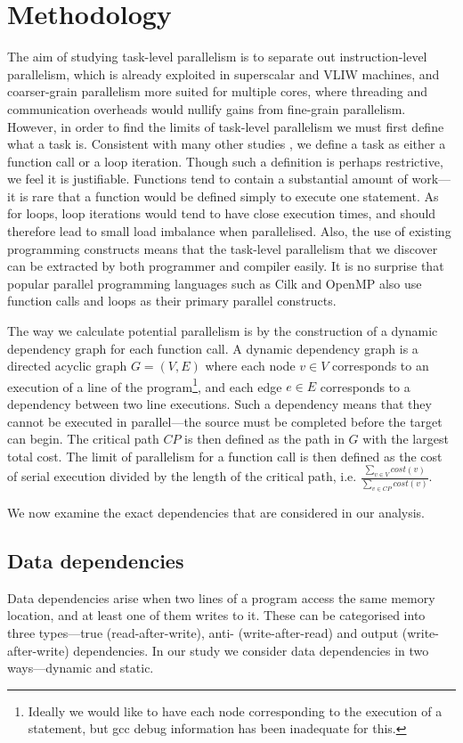 \section{Methodology}

The aim of studying task-level parallelism is to separate out instruction-level parallelism, which is already exploited in superscalar and VLIW machines, and coarser-grain parallelism more suited for multiple cores, where threading and communication overheads would nullify gains from fine-grain parallelism.
However, in order to find the limits of task-level parallelism we must first define what a task is.
Consistent with many other studies \cite{Kreaseck00limitsof}, we define a task as either a function call or a loop iteration.
Though such a definition is perhaps restrictive, we feel it is justifiable.
Functions tend to contain a substantial amount of work---it is rare that a function would be defined simply to execute one statement.
As for loops, loop iterations would tend to have close execution times, and should therefore lead to small load imbalance when parallelised.
Also, the use of existing programming constructs means that the task-level parallelism that we discover can be extracted by both programmer and compiler easily.
It is no surprise that popular parallel programming languages such as Cilk \cite{cilk546referencemanual} and OpenMP \cite{dagum98openmp} also use function calls and loops as their primary parallel constructs.

The way we calculate potential parallelism is by the construction of a dynamic dependency graph for each function call.
A dynamic dependency graph is a directed acyclic graph $G=(V,E)$ where each node $v\in V$ corresponds to an execution of a line of the program\footnote{Ideally we would like to have each node corresponding to the execution of a statement, but gcc debug information has been inadequate for this.}, and each edge $e\in E$ corresponds to a dependency between two line executions.
Such a dependency means that they cannot be executed in parallel---the source must be completed before the target can begin.
The critical path $CP$ is then defined as the path in $G$ with the largest total cost.
The limit of parallelism for a function call is then defined as the cost of serial execution divided by the length of the critical path, i.e. $\frac{\sum_{v\in V} cost(v)}{\sum_{v\in CP} cost(v)}$.

We now examine the exact dependencies that are considered in our analysis.

\subsection{Data dependencies}
Data dependencies arise when two lines of a program access the same memory location, and at least one of them writes to it.
These can be categorised into three types---true (read-after-write), anti- (write-after-read) and output (write-after-write) dependencies.
In our study we consider data dependencies in two ways---dynamic and static.

